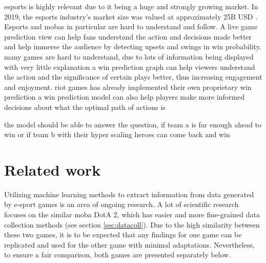 \documentclass[12pt, a4paper, headinclude, twoside, plainheadsepline, open=right, numbers=noenddot, hidelinks, toc=listof, toc=bibliography]{scrreprt}
\begin{document}
esports is highly relevant due to it being a huge and strongly growing market.
In 2019, the esports industry's market size was valued at approximately 25B USD \cite{ahnOneBillionDollar2020}.
Esports and mobas in particular are hard to understand and follow. A live game prediction view can help fans understand the action and decisions made better and help immerse the audience by detecting upsets and swings in win probability.
many games are hard to understand, due to lots of information being displayed with very little explanation
a win prediction graph can help viewers understand the action and the significance of certain plays better, thus increasing engagement and enjoyment.
riot games has already implemented their own proprietary win prediction
a win prediction model can also help players make more informed decisions about what the optimal path of actions is

the model should be able to answer the question, if team a is far enough ahead to win or if team b with their hyper scaling heroes can come back and win


\chapter{Related work}
\label{chap:related}

Utilizing machine learning methods to extract information from data generated by e-sport games is an area of ongoing research.
A lot of scientific research focuses on the similar \ac{moba} DotA 2, which has easier and more fine-grained data collection methods (see section \ref{sec:datacoll}).
Due to the high similarity between these two games, it is to be expected that any findings for one game can be replicated and used for the other game with minimal adaptations.
Nevertheless, to ensure a fair comparison, both games are presented separately below.
\end{document}
